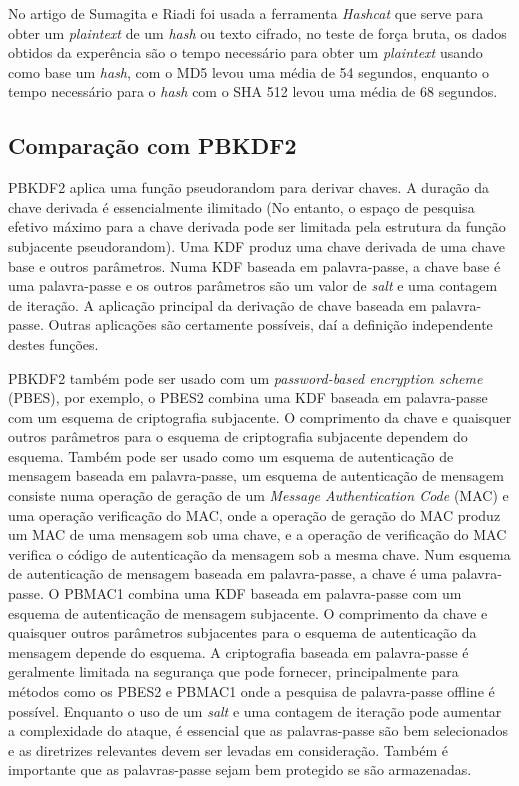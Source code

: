 \documentclass[conference]{IEEEtran}
\begin{document}
No artigo de Sumagita e Riadi \cite{sumagita2018analysis} foi usada a ferramenta \textit{Hashcat} 
que serve para obter um \textit{plaintext} de um \textit{hash} 
ou texto cifrado, no teste de força bruta, os dados obtidos da experência são o tempo necessário 
para obter um \textit{plaintext} usando como base um \textit{hash}, com o MD5 levou uma média de 54 segundos, 
enquanto o tempo necessário para o \textit{hash} com o SHA 512 levou uma média de 68 segundos. 

\subsection{Comparação com PBKDF2}

PBKDF2 aplica uma função pseudorandom para derivar chaves. A duração da chave 
derivada é essencialmente ilimitado (No entanto, o espaço de pesquisa efetivo 
máximo para a chave derivada pode ser limitada pela estrutura da função subjacente 
pseudorandom). Uma KDF produz uma chave derivada de uma chave base e
outros parâmetros. Numa KDF baseada em palavra-passe, a chave base é 
uma palavra-passe e os outros parâmetros são um valor de \textit{salt} e uma contagem de iteração.
A aplicação principal da derivação de chave baseada em palavra-passe. Outras aplicações são 
certamente possíveis, daí a definição independente destes funções. \cite{rfc2898}

PBKDF2 também pode ser usado com um \textit{password-based encryption scheme} (PBES), por exemplo, 
o PBES2 combina uma KDF baseada em palavra-passe com um esquema de criptografia 
subjacente. O comprimento da chave e quaisquer outros parâmetros para o esquema de criptografia 
subjacente dependem do esquema. Também pode ser usado como um esquema de autenticação de mensagem 
baseada em palavra-passe, um esquema de autenticação de mensagem consiste numa operação de geração de um 
\textit{Message Authentication Code} (MAC) e uma operação verificação do MAC, onde a operação de 
geração do MAC produz um MAC de uma mensagem sob uma chave, e a operação de verificação do MAC verifica o
código de autenticação da mensagem sob a mesma chave. Num esquema de autenticação de mensagem baseada 
em palavra-passe, a chave é uma palavra-passe. O PBMAC1 combina uma KDF baseada em palavra-passe com um
esquema de autenticação de mensagem subjacente. O comprimento da chave e quaisquer outros parâmetros 
subjacentes para o esquema de autenticação da mensagem depende do esquema. A criptografia baseada 
em palavra-passe é geralmente limitada na segurança que pode fornecer, principalmente para métodos como os 
PBES2 e PBMAC1 onde a pesquisa de palavra-passe offline é possível. Enquanto o uso de um \textit{salt} e uma contagem 
de iteração pode aumentar a complexidade do ataque, é essencial que as palavras-passe são bem selecionados 
e as diretrizes relevantes devem ser levadas em consideração. Também é importante que as palavras-passe sejam
bem protegido se são armazenadas. \cite{rfc8018}
\end{document}
